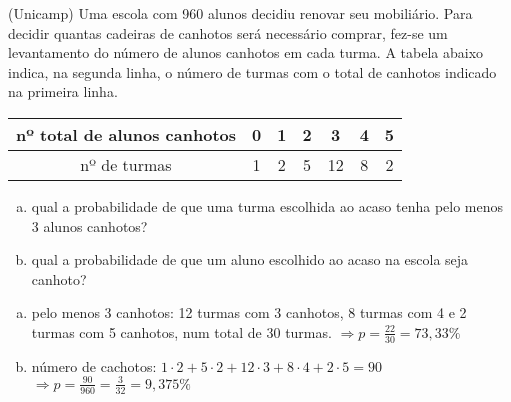 \begin{ex}
  (Unicamp) Uma escola com 960 alunos decidiu renovar seu mobiliário. Para decidir quantas cadeiras de canhotos será necessário comprar, fez-se um levantamento do número de alunos canhotos em cada turma. A tabela abaixo indica, na segunda linha, o número de turmas com o total de canhotos indicado na primeira linha. \\
    \begin{center}
        \begin{tabular}{|c|c|c|c|c|c|c|}  \hline
            nº total de alunos canhotos &0&1&2&3&4&5  \\ \hline
           nº de turmas  &1&2&5&12&8&2 \\  \hline
        \end{tabular}
    \begin{enumerate} [(a)]
        \item qual a probabilidade de que uma turma escolhida ao acaso tenha pelo menos 3 alunos canhotos?
        \item qual a probabilidade de que um aluno escolhido ao acaso na escola seja canhoto? 
    \end{enumerate}
      \begin{sol}
       \phantom{A}
       \begin{enumerate} [(a)]
           \item pelo menos 3 canhotos: 12 turmas com 3 canhotos, 8 turmas com 4 e 2 turmas com 5 canhotos, num total de 30 turmas.
           $\Longrightarrow p=\frac{22}{30}=73,33\%$
           \item número de cachotos: $1\cdot2+5\cdot2+12\cdot3+8\cdot4+2\cdot5=90$\hspace{0,4cm} $\Longrightarrow p=\frac{90}{960}=\frac{3}{32}=9,375\%$
       \end{enumerate}
      \end{sol}
    \end{center}
\end{ex}